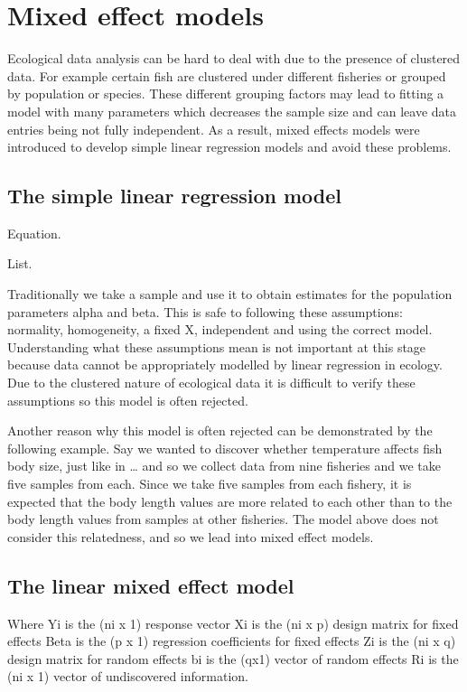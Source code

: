 \documentclass{article}
\begin{document}
\section{Mixed effect models}

Ecological data analysis can be hard to deal with due to the presence of clustered data. For example certain fish are clustered under different fisheries or grouped by population or species. These different grouping factors may lead to fitting a model with many parameters which decreases the sample size and can leave data entries being not fully independent. As a result, mixed effects models were introduced to develop simple linear regression models and avoid these problems. 

\subsection{The simple linear regression model}

Equation.

List.

Traditionally we take a sample and use it to obtain estimates for the population parameters alpha and beta. This is safe to following these assumptions: normality, homogeneity, a fixed X, independent and using the correct model. Understanding what these assumptions mean is not important at this stage because data cannot be appropriately modelled by linear regression in ecology. Due to the clustered nature of ecological data it is difficult to verify these assumptions so this model is often rejected.

Another reason why this model is often rejected can be demonstrated by the following example. Say we wanted to discover whether temperature affects fish body size, just like in … and so we collect data from nine fisheries and we take five samples from each. Since we take five samples from each fishery, it is expected that the body length values are more related to each other than to the body length values from samples at other fisheries. The model above does not consider this relatedness, and so we lead into mixed effect models. 

\subsection{The linear mixed effect model}




Where
Yi is the (ni x 1) response vector
Xi is the (ni x p) design matrix for fixed effects
Beta is the (p x 1) regression coefficients for fixed effects
Zi is the (ni x q) design matrix for random effects
bi is the (qx1) vector of random effects
Ri is the (ni x 1) vector of undiscovered information.
\end{document}
